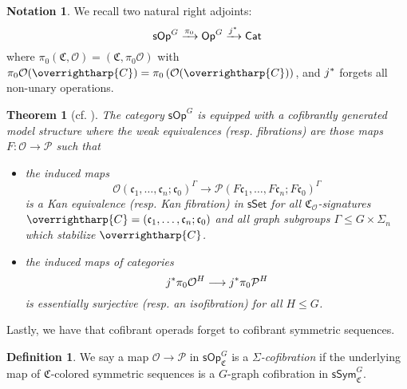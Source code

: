 \documentclass[a4paper,10pt
,draft
]{article}%
\numberwithin{equation}{section}
\numberwithin{figure}{section}
\newtheorem{theorem}[equation]{Theorem}%
\theoremstyle{definition} %
\newtheorem{definition}[equation]{Definition}%
\newtheorem{notation}[equation]{Notation}%
\newcommand{\longto}{\longrightarrow}%
\newcommand{\vect}[1]{\text{\overrightharp{\ensuremath{#1}}}}
\newcommand{\sSet}{\ensuremath{\mathsf{sSet}}}%
\newcommand{\Cat}{\mathsf{Cat}}
\newcommand{\Op}{\mathsf{Op}}%
\newcommand{\sOp}{\ensuremath{\mathsf{sOp}}}%
\newcommand{\sSym}{\ensuremath{\mathsf{sSym}}}%
\DeclareMathOperator{\Aut}{Aut}%
\renewcommand{\O}{\ensuremath{\mathcal O}}
\renewcommand{\P}{\ensuremath{\mathcal P}}
\newcommand{\1}{\ensuremath{\mathbbm 1}}%
\begin{document}

\begin{notation}
      We recall two natural right adjoints:
      \[
            \sOp^G \xrightarrow{\pi_0}
            \Op^G \xrightarrow{j^{\**}}
            \Cat
      \]
      where $\pi_0(\mathfrak C, \O) = (\mathfrak C, \pi_0 \O)$ with $\pi_0\O(\vect C) = \pi_0\left(\O(\vect C)\right)$,
      and $j^{\**}$ forgets all non-unary operations.
\end{notation}

\begin{theorem}[{cf. \cite[Thm. III, Prop. 4.78]{BP_HGOP}}] %
      The category $\sOp^G$ is equipped with a cofibrantly generated model structure where the weak equivalences (resp. fibrations) are those maps
      $F \colon \O \to \P$ such that
      \begin{itemize}
      \item the induced maps
            \begin{equation}
                  \label{DKEQUIV_EQ}
                  \O(\mathfrak c_1, \dots, \mathfrak c_n; \mathfrak c_0)^\Gamma \longto \P(F \mathfrak c_1, \dots, F \mathfrak c_n; F \mathfrak c_0)^\Gamma
            \end{equation}
            is a Kan equivalence (resp. Kan fibration) in $\sSet$
            for all $\mathfrak C_\O$-signatures $\vect C = (\mathfrak c_1, \dots, \mathfrak c_n; \mathfrak c_0)$
            and all \textit{graph subgroups} $\Gamma \leq G \times \Sigma_n$ which stabilize $\vect C$.
      \item the induced maps of categories
            \[
                  j^{\**}\pi_0 \O^H \longto j^{\**}\pi_0 \P^H
            \]
            is essentially surjective (resp. an isofibration) for all $H \leq G$.
      \end{itemize}
\end{theorem}


Lastly, we have that cofibrant operads forget to cofibrant symmetric sequences.
\begin{definition}
      We say a map $\O \to \P$ in $\sOp^G_{\mathfrak C}$ is a \textit{$\Sigma$-cofibration}
      if the underlying map of $\mathfrak C$-colored symmetric sequences is a $G$-graph cofibration in $\sSym_{\mathfrak C}^G$. 
\end{definition}
\end{document}
